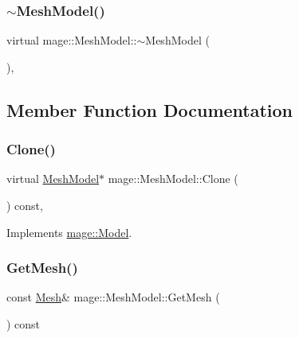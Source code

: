 \hypertarget{classmage_1_1_mesh_model_a5e918737b966842a31381ef6c00ca6d2}{}\label{classmage_1_1_mesh_model_a5e918737b966842a31381ef6c00ca6d2} 
\subsubsection{\texorpdfstring{$\sim$\+Mesh\+Model()}{~MeshModel()}}
{\footnotesize\ttfamily virtual mage\+::\+Mesh\+Model\+::$\sim$\+Mesh\+Model (\begin{DoxyParamCaption}{ }\end{DoxyParamCaption})\hspace{0.3cm}{\ttfamily [virtual]}, {\ttfamily [default]}}



\subsection{Member Function Documentation}
\hypertarget{classmage_1_1_mesh_model_a7130eca9a1dac038c33b838c15138161}{}\label{classmage_1_1_mesh_model_a7130eca9a1dac038c33b838c15138161} 
\subsubsection{\texorpdfstring{Clone()}{Clone()}}
{\footnotesize\ttfamily virtual \hyperlink{classmage_1_1_mesh_model}{Mesh\+Model}$\ast$ mage\+::\+Mesh\+Model\+::\+Clone (\begin{DoxyParamCaption}{ }\end{DoxyParamCaption}) const\hspace{0.3cm}{\ttfamily [override]}, {\ttfamily [virtual]}}



Implements \hyperlink{classmage_1_1_model_ae5e9bee52da0db8c7a29920c13ed40ea}{mage\+::\+Model}.

\hypertarget{classmage_1_1_mesh_model_ab9a1c64ebb6b72cd6862e701983351c4}{}\label{classmage_1_1_mesh_model_ab9a1c64ebb6b72cd6862e701983351c4} 
\subsubsection{\texorpdfstring{Get\+Mesh()}{GetMesh()}}
{\footnotesize\ttfamily const \hyperlink{classmage_1_1_mesh}{Mesh}\& mage\+::\+Mesh\+Model\+::\+Get\+Mesh (\begin{DoxyParamCaption}{ }\end{DoxyParamCaption}) const}

